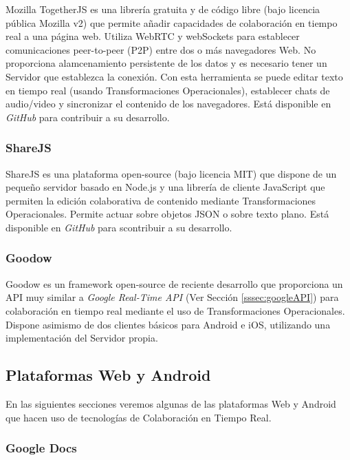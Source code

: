 	Mozilla TogetherJS \cite{ref:togetherjs_api} es una librería gratuita y de código libre (bajo licencia pública Mozilla v2) que permite añadir capacidades de colaboración en tiempo real a una página web. Utiliza WebRTC y webSockets para establecer comunicaciones peer-to-peer (P2P) entre dos o más navegadores Web. No proporciona alamcenamiento persistente de los datos y es necesario tener un Servidor que establezca la conexión. Con esta herramienta se puede editar texto en tiempo real (usando Transformaciones Operacionales), establecer chats de audio/video y sincronizar el contenido de los navegadores. Está disponible en \textit{GitHub} \cite{ref:github} para contribuir a su desarrollo. 	
	
	\subsubsection{ShareJS}

	ShareJS \cite{ref:shareJS} es una plataforma open-source (bajo licencia MIT) que dispone de un pequeño servidor basado en Node.js y una librería de cliente JavaScript que permiten la edición colaborativa de contenido mediante Transformaciones Operacionales. Permite actuar sobre objetos JSON o sobre texto plano. Está disponible en \textit{GitHub} para scontribuir a su desarrollo.
	
	\subsubsection{Goodow}
	
	Goodow \cite{ref:goodow} es un framework open-source de reciente desarrollo que proporciona un API muy similar a \textit{Google Real-Time API} (Ver Sección \ref{sssec:googleAPI}) para colaboración en tiempo real mediante el uso de Transformaciones Operacionales. Dispone asimismo de dos clientes básicos para Android e iOS, utilizando una implementación del Servidor propia.	
	
	\subsection{Plataformas Web y Android}

	En las siguientes secciones veremos algunas de las plataformas Web y Android que hacen uso de tecnologías de Colaboración en Tiempo Real.	
	
	\subsubsection{Google Docs}
	
